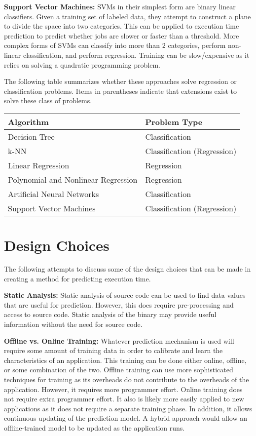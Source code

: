 \documentclass[11pt, letterpaper]{article}
\begin{document}
\noindent\textbf{Support Vector Machines: }  SVMs in their simplest form are binary
linear classifiers. Given a training set of labeled data, they attempt to
construct a plane to divide the space into two categories. This can be applied
to execution time prediction to predict whether jobs are slower or faster than
a threshold. More complex forms of SVMs can classify into more than 2
categories, perform non-linear classification, and perform regression. Training can
be slow/expensive as it relies on solving a quadratic programming problem.

The following table summarizes whether these approaches solve regression or
classification problems. Items in parentheses indicate that extensions exist to
solve these class of problems.

\begin{tabular}{|l|l|}
\hline
Algorithm & Problem Type \\ \hline\hline
Decision Tree & Classification \\ \hline
k-NN & Classification (Regression) \\ \hline
Linear Regression & Regression \\ \hline
Polynomial and Nonlinear Regression & Regression \\ \hline
Artificial Neural Networks & Classification \\ \hline
Support Vector Machines & Classification (Regression) \\ \hline
\end{tabular}

\section{Design Choices}

The following attempts to discuss some of the design choices that can be made
in creating a method for predicting execution time.

\noindent\textbf{Static Analysis: } Static analysis of source code can be used to find
data values that are useful for prediction. However, this does require
pre-processing and access to source code. Static analysis of the binary may
provide useful information without the need for source code.

\noindent\textbf{Offline vs. Online Training: } Whatever prediction mechanism is used
will require some amount of training data in order to calibrate and learn the
characteristics of an application. This training can be done either online,
offline, or some combination of the two. Offline training can use more
sophisticated techniques for training as its overheads do not contribute to the
overheads of the application. However, it requires more programmer effort.
Online training does not require extra programmer effort. It also is likely
more easily applied to new applications as it does not require a separate
training phase. In addition, it allows continuous updating of the prediction model.
A hybrid approach would allow an offline-trained model to be updated as the
application runs.
\end{document}
